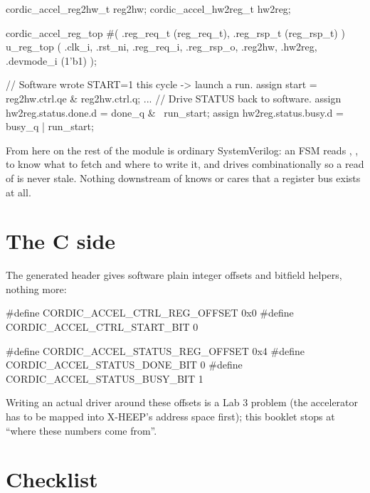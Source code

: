 \begin{svcode}[caption={rtl/cordic\_accel.sv -- instantiating the CSR block}]
cordic_accel_reg2hw_t reg2hw;
cordic_accel_hw2reg_t hw2reg;

cordic_accel_reg_top #(
  .reg_req_t (reg_req_t),
  .reg_rsp_t (reg_rsp_t)
) u_reg_top (
  .clk_i, .rst_ni,
  .reg_req_i,
  .reg_rsp_o,
  .reg2hw,
  .hw2reg,
  .devmode_i (1'b1)
);

// Software wrote START=1 this cycle -> launch a run.
assign start = reg2hw.ctrl.qe & reg2hw.ctrl.q;
...
// Drive STATUS back to software.
assign hw2reg.status.done.d = done_q & ~run_start;
assign hw2reg.status.busy.d = busy_q  | run_start;
\end{svcode}

From here on the rest of the module is ordinary SystemVerilog: an FSM reads
, ,  to know what to
fetch and where to write it, and drives  combinationally
so a read of  is never stale. Nothing downstream of
 knows or cares that a register bus exists at all.

\section{The C side}

The generated header gives software plain integer offsets and bitfield
helpers, nothing more:

\begin{cppcode}[caption={sw/cordic\_accel\_regs.h (generated, excerpt)}]
#define CORDIC_ACCEL_CTRL_REG_OFFSET 0x0
#define CORDIC_ACCEL_CTRL_START_BIT 0

#define CORDIC_ACCEL_STATUS_REG_OFFSET 0x4
#define CORDIC_ACCEL_STATUS_DONE_BIT 0
#define CORDIC_ACCEL_STATUS_BUSY_BIT 1
\end{cppcode}

Writing an actual driver around these offsets is a Lab 3 problem (the
accelerator has to be mapped into X-HEEP's address space first); this
booklet stops at ``where these numbers come from''.

\section{Checklist}
\label{sec:regtool:checklist}

